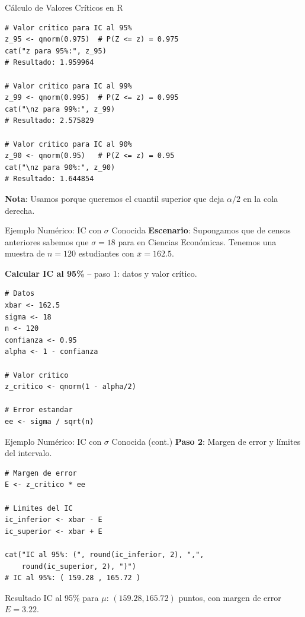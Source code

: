 \documentclass[aspectratio=169, 11pt]{beamer}
\begin{document}
\begin{frame}[fragile]{Cálculo de Valores Críticos en R}
\begin{lstlisting}
# Valor critico para IC al 95%
z_95 <- qnorm(0.975)  # P(Z <= z) = 0.975
cat("z para 95%:", z_95)
# Resultado: 1.959964

# Valor critico para IC al 99%
z_99 <- qnorm(0.995)  # P(Z <= z) = 0.995
cat("\nz para 99%:", z_99)
# Resultado: 2.575829

# Valor critico para IC al 90%
z_90 <- qnorm(0.95)   # P(Z <= z) = 0.95
cat("\nz para 90%:", z_90)
# Resultado: 1.644854
\end{lstlisting}

\vspace{0.3cm}
\textbf{Nota}: Usamos  porque queremos el cuantil superior que deja $\alpha/2$ en la cola derecha.
\end{frame}

\begin{frame}[fragile]{Ejemplo Numérico: IC con $\sigma$ Conocida}
\textbf{Escenario}: Supongamos que de censos anteriores sabemos que $\sigma = 18$ para  en Ciencias Econ\'omicas. Tenemos una muestra de $n = 120$ estudiantes con $\bar{x} = 162.5$.

\vspace{0.2cm}
\textbf{Calcular IC al 95\%} -- paso 1: datos y valor crítico.

\begin{lstlisting}
# Datos
xbar <- 162.5
sigma <- 18
n <- 120
confianza <- 0.95
alpha <- 1 - confianza

# Valor critico
z_critico <- qnorm(1 - alpha/2)

# Error estandar
ee <- sigma / sqrt(n)
\end{lstlisting}
\end{frame}

\begin{frame}[fragile]{Ejemplo Numérico: IC con $\sigma$ Conocida (cont.)}
\textbf{Paso 2}: Margen de error y límites del intervalo.

\begin{lstlisting}
# Margen de error
E <- z_critico * ee

# Limites del IC
ic_inferior <- xbar - E
ic_superior <- xbar + E

cat("IC al 95%: (", round(ic_inferior, 2), ",",
    round(ic_superior, 2), ")")
# IC al 95%: ( 159.28 , 165.72 )
\end{lstlisting}

\vspace{0.3cm}
\begin{exampleblock}{Resultado}
IC al 95\% para $\mu$: $(159.28, 165.72)$ puntos, con margen de error $E = 3.22$.
\end{exampleblock}
\end{frame}
\end{document}
